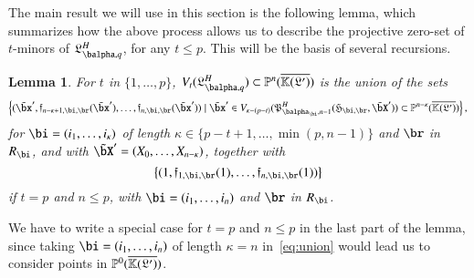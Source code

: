 \documentclass[amsthm]{elsart}
\newtheorem{lemma}[definition]{Lemma}
\begin{document}
The main result we will use in this section is the following lemma,
which summarizes how the above process allows us to describe the
projective zero-set of $t$-minors of $\mathfrak{L}^H_{\balpha,q}$, for
any $t \le p$. This will be the basis of several recursions.
\begin{lemma}\label{lemma:union}
  For $t$ in $\{1,\dots,p\}$, $V_t(\mathfrak{L}^H_{\balpha,q}) \subset \P^{n}(\KKGpbar)$ is the
  union of the sets
 \begin{align}\label{eq:union}
 \left \{(\tilde\bx',\mathfrak{f}_{n-\kappa+1,\bi,\br}(\tilde\bx'),\dots,\mathfrak{f}_{n,\bi,\br}(\tilde\bx')) \mid \tilde\bx' \in
  V_{\kappa-(p-t)}(\mathfrak{P}^H_{\balpha_\bi,n-1}(\mathfrak{H}_{\bi,\br},\tilde\bX')) \subset \P^{n-\kappa}(\KKGpbar)\right \},   
 \end{align}
 for $\bi=(i_1,\dots,i_\kappa)$ of length $\kappa \in \{p-t+1,\dots,\min(p,n-1)\}$ and $\br$ in $R_\bi$,
 and with $\tilde\bX'=(X_0,\dots,X_{n-\kappa})$, together with
 $$\left \{
 (1,\mathfrak{f}_{1,\bi,\br}(1),\dots,\mathfrak{f}_{n,\bi,\br}(1))\right
 \}$$ if $t=p$ and $n \le p$, with $\bi=(i_1,\dots,i_n)$ and $\br$ in $R_\bi$.
\end{lemma}
\noindent We have to write a special case for $t=p$ and $n \le p$ in the last part of the lemma,
since taking $\bi=(i_1,\dots,i_n)$ of length $\kappa=n$
in~\eqref{eq:union} would lead us to consider points in $\mathbb{P}^0(\overline{\mathbb{K}(\mathfrak{L}')})$.
\end{document}
